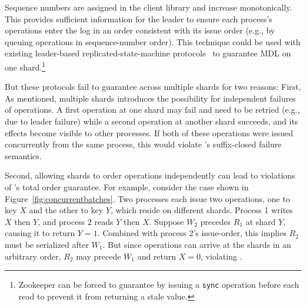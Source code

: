 
 Sequence numbers are assigned in the client 
library and increase monotonically. This provides sufficient information for
the leader to ensure each process's operations enter the log in an
order consistent with its issue order
(e.g., by queuing operations in sequence-number order).
This technique could be used with existing leader-based replicated-state-machine
protocols~\cite{ongaro2014raft,lamport1998paxos,oki1988vr} to guarantee
MDL on one shard.\footnote{Zookeeper can be forced to
guarantee \MDL{} by issuing a \texttt{sync} operation before each read to prevent it from returning a stale value.}

But these protocols fail to 
guarantee \MDL{} across multiple shards for two reasons: First,
As mentioned, multiple shards
introduces the possibility for independent failures of operations. A first
operation at one shard may fail and need to be retried (e.g., due to
leader failure) while a second operation at another shard succeeds, and
its effects become visible to other processes. If both of these
operations were issued concurrently from the same process, 
this would violate \MDL{}'s suffix-closed failure semantics.

Second, allowing shards to order operations independently can lead to
violations of \MDL{}'s total order guarantee. For example, consider the
case shown in Figure~\ref{fig:concurrentbatches}. Two processes each issue two
operations, one to key $X$ and the other to key $Y$, which reside on different
shards. Process 1 writes $X$ then $Y$, and process 2 reads $Y$ then $X$. Suppose $W_2$ precedes $R_1$ at shard $Y$, causing it to return $Y=1$. Combined with
process 2's issue-order, this implies $R_2$ must be serialized after $W_1$.
But since operations can arrive at the shards in an arbitrary order, $R_2$ may
precede $W_1$ and return $X=0$, violating \MDL{}.

%